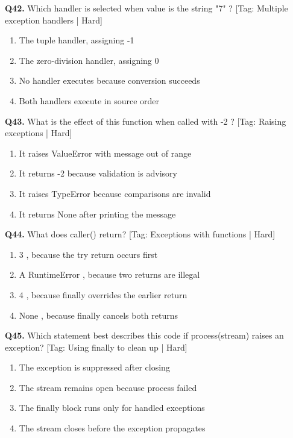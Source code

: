 \vspace{2mm}
\noindent\textbf{Q42.} Which handler is selected when value is the string "7" ? \hfill [Tag: Multiple exception handlers | Hard]
\begin{enumerate}[label=(\alph*),topsep=2pt,itemsep=1pt,partopsep=0pt,parsep=0pt]
    \item {The tuple handler, assigning -1}
    \item {The zero-division handler, assigning 0}
    \item {No handler executes because conversion succeeds}
    \item {Both handlers execute in source order}
\end{enumerate}
\vspace{2mm}
\noindent\textbf{Q43.} What is the effect of this function when called with -2 ? \hfill [Tag: Raising exceptions | Hard]
\begin{enumerate}[label=(\alph*),topsep=2pt,itemsep=1pt,partopsep=0pt,parsep=0pt]
    \item {It raises ValueError with message out of range}
    \item {It returns -2 because validation is advisory}
    \item {It raises TypeError because comparisons are invalid}
    \item {It returns None after printing the message}
\end{enumerate}
\vspace{2mm}
\noindent\textbf{Q44.} What does caller() return? \hfill [Tag: Exceptions with functions | Hard]
\begin{enumerate}[label=(\alph*),topsep=2pt,itemsep=1pt,partopsep=0pt,parsep=0pt]
    \item {3 , because the try return occurs first}
    \item {A RuntimeError , because two returns are illegal}
    \item {4 , because finally overrides the earlier return}
    \item {None , because finally cancels both returns}
\end{enumerate}
\vspace{2mm}
\noindent\textbf{Q45.} Which statement best describes this code if process(stream) raises an exception? \hfill [Tag: Using finally to clean up | Hard]
\begin{enumerate}[label=(\alph*),topsep=2pt,itemsep=1pt,partopsep=0pt,parsep=0pt]
    \item {The exception is suppressed after closing}
    \item {The stream remains open because process failed}
    \item {The finally block runs only for handled exceptions}
    \item {The stream closes before the exception propagates}
\end{enumerate}
